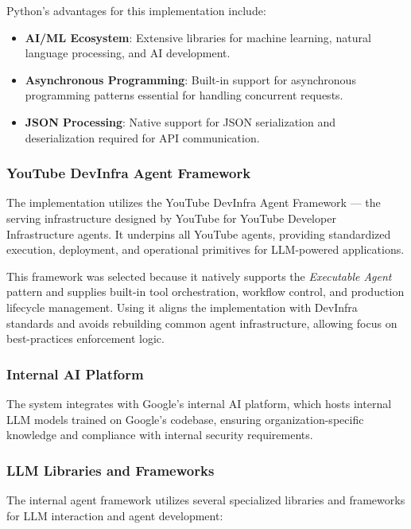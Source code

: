 \begin{spacing}{1.2}
Python's advantages for this implementation include:
\begin{itemize}
    \item \textbf{AI/ML Ecosystem}: Extensive libraries for machine learning, natural language processing, and AI development.
    \item \textbf{Asynchronous Programming}: Built-in support for asynchronous programming patterns essential for handling concurrent requests.
    \item \textbf{JSON Processing}: Native support for JSON serialization and deserialization required for API communication.
\end{itemize}



\subsubsection{YouTube DevInfra Agent Framework}
The implementation utilizes the YouTube DevInfra Agent Framework — the serving infrastructure designed by YouTube for YouTube Developer Infrastructure agents. It underpins all YouTube agents, providing standardized execution, deployment, and operational primitives for LLM-powered applications.

This framework was selected because it natively supports the \textit{Executable Agent} pattern and supplies built-in tool orchestration, workflow control, and production lifecycle management. Using it aligns the implementation with DevInfra standards and avoids rebuilding common agent infrastructure, allowing focus on best-practices enforcement logic.



\subsubsection{Internal AI Platform}
The system integrates with Google's internal AI platform, which hosts internal LLM models trained on Google's codebase, ensuring organization-specific knowledge and compliance with internal security requirements.


\subsubsection{LLM Libraries and Frameworks}
The internal agent framework utilizes several specialized libraries and frameworks for LLM interaction and agent development:


\end{spacing}

